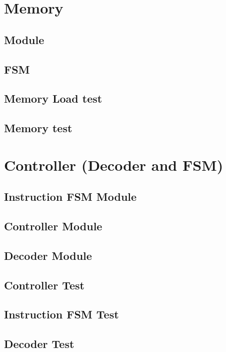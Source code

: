 \documentclass[11pt]{article}
\begin{document}
\newpage
\appendixname
\appendix
\section{Memory}
\subsection{Module}
\tiny 
\subsection{FSM}
\tiny 
\subsection{Memory Load test}
\tiny 
\subsection{Memory test}
\tiny 
\section{Controller (Decoder and FSM)}
\subsection{Instruction FSM Module}
\tiny 
\subsection{Controller Module}
\tiny 
\subsection{Decoder Module}
\tiny 
\subsection{Controller Test}
\tiny 
\subsection{Instruction FSM Test}
\tiny 
\subsection{Decoder Test}
\tiny 
\end{document}
